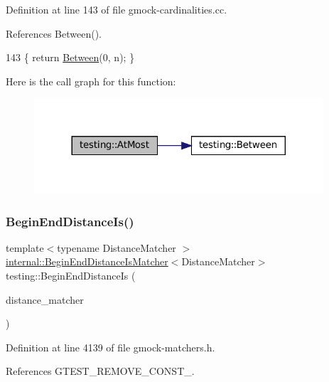 Definition at line 143 of file gmock-\/cardinalities.\+cc.



References Between().


\begin{DoxyCode}
143 \{ \textcolor{keywordflow}{return} \hyperlink{namespacetesting_a3bb2d3cdd3fdf5b4be1480fce549918e}{Between}(0, n); \}
\end{DoxyCode}
Here is the call graph for this function\+:
\nopagebreak
\begin{figure}[H]
\begin{center}
\leavevmode
\includegraphics[width=305pt]{namespacetesting_a5487cd1068c78821ced96fbf542a91bb_cgraph}
\end{center}
\end{figure}
\mbox{\label{namespacetesting_a122739b5b6bd9f993f26800dafdb4cc3}} 
\subsubsection{\texorpdfstring{Begin\+End\+Distance\+Is()}{BeginEndDistanceIs()}}
{\footnotesize\ttfamily template$<$typename Distance\+Matcher $>$ \\
\hyperlink{classtesting_1_1internal_1_1BeginEndDistanceIsMatcher}{internal\+::\+Begin\+End\+Distance\+Is\+Matcher}$<$Distance\+Matcher$>$ testing\+::\+Begin\+End\+Distance\+Is (\begin{DoxyParamCaption}\item[{const Distance\+Matcher \&}]{distance\+\_\+matcher }\end{DoxyParamCaption})\hspace{0.3cm}{\ttfamily [inline]}}



Definition at line 4139 of file gmock-\/matchers.\+h.



References G\+T\+E\+S\+T\+\_\+\+R\+E\+M\+O\+V\+E\+\_\+\+C\+O\+N\+S\+T\+\_\+.


